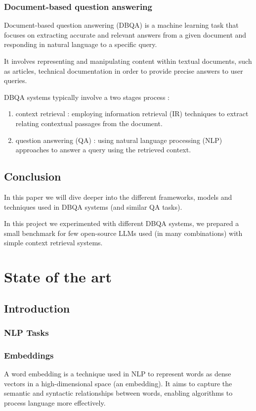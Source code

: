 \documentclass[a4paper,12pt]{article}
\begin{document}
\subsubsection{Document-based question answering}
Document-based question answering (DBQA) is a machine learning task that focuses on extracting accurate and relevant answers from a given document and responding in natural language to a specific query. 

It involves representing and manipulating content within textual documents, such as articles, technical documentation in order to provide precise answers to user queries.

DBQA systems typically involve a two stages process : 
\begin{enumerate}
    \item context retrieval : employing information retrieval (IR) techniques to extract relating contextual passages from the document.
    \item question answering (QA) : using natural language processing (NLP) approaches to answer a query using the retrieved context.  
\end{enumerate}  

\subsection{Conclusion}
In this paper we will dive deeper into the different frameworks, models and techniques used in DBQA systems (and similar QA tasks).

In this project we experimented with different DBQA systems, we prepared a small benchmark for few open-source LLMs used (in many combinations) with simple context retrieval systems.

\clearpage
\section{State of the art}
\subsection{Introduction}

\subsubsection{NLP Tasks}


\subsubsection{Embeddings}
A word embedding is a technique used in NLP to represent words as dense vectors in a high-dimensional space (an embedding). It aims to capture the semantic and syntactic relationships between words, enabling algorithms to process language more effectively.
\end{document}
